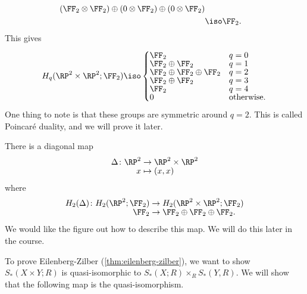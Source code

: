\documentclass{standalone}
\begin{document}
\begin{example}
\begin{align*}
            (\FF_2 \otimes \FF_2) \oplus
            (0     \otimes \FF_2) \oplus
            (0     \otimes \FF_2) \\
      &\iso \FF_2.
  \end{align*}
  This gives
  \[
    H_q(\RP^2 \times \RP^2; \FF_2) \iso \begin{cases}
      \FF_2                           & q = 0            \\[-1ex]
      \FF_2 \oplus \FF_2              & q = 1            \\[-1ex]
      \FF_2 \oplus \FF_2 \oplus \FF_2 & q = 2            \\[-1ex]
      \FF_2 \oplus \FF_2              & q = 3            \\[-1ex]
      \FF_2                           & q = 4            \\[-1ex]
      0                               & \text{otherwise.}
    \end{cases}
  \]
  One thing to note is that these groups are symmetric around \(q = 2\).
  This is called Poincar\'e duality, and we will prove it later.
\end{example}

\begin{remark}
  There is a diagonal map
  \begin{align*}
    \Delta \colon \RP^2 &\to \RP^2 \times \RP^2 \\[-1ex]
      x &\mapsto (x, x)
  \end{align*}
  where
  \begin{align*}
    H_2(\Delta) \colon H_2(\RP^2; \FF_2) &\to
                        H_2(\RP^2 \times \RP^2; \FF_2) \\[-1ex]
      \FF_2 &\to \FF_2 \oplus \FF_2 \oplus \FF_2.
  \end{align*}
  We would like the figure out how to describe this map.
  We will do this later in the course.
\end{remark}

To prove Eilenberg-Zilber (\cref{thm:eilenberg-zilber}),
we want to show \(S_*(X \times Y; R)\) is quasi-isomorphic to
\(S_*(X; R) \times_R S_*(Y, R)\).
We will show that the following map is the quasi-isomorphism.
\end{document}
